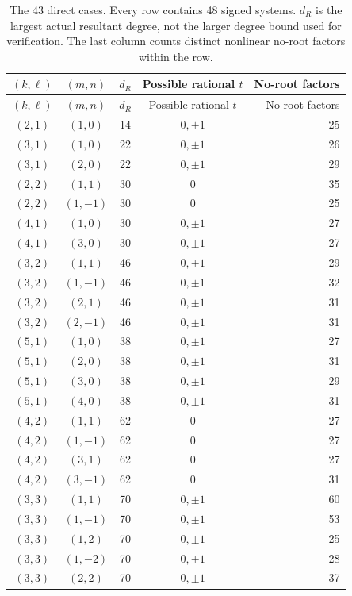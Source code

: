 {\small\setlength{\tabcolsep}{6pt}\renewcommand{\arraystretch}{1.12}
\begin{longtable}{ccccr}
\caption{The 43 direct cases. Every row contains 48 signed systems. $d_R$ is the largest actual resultant degree, not the larger degree bound used for verification. The last column counts distinct nonlinear no-root factors within the row.}\label{tab:representatives}\\
\toprule
$(k,\ell)$ & $(m,n)$ & $d_R$ & Possible rational $t$ & No-root factors\\
\midrule\endfirsthead
\toprule
$(k,\ell)$ & $(m,n)$ & $d_R$ & Possible rational $t$ & No-root factors\\
\midrule\endhead
$(2,1)$ & $(1,0)$ & 14 & $0,\pm1$ & 25\\
$(3,1)$ & $(1,0)$ & 22 & $0,\pm1$ & 26\\
$(3,1)$ & $(2,0)$ & 22 & $0,\pm1$ & 29\\
$(2,2)$ & $(1,1)$ & 30 & $0$ & 35\\
$(2,2)$ & $(1,-1)$ & 30 & $0$ & 25\\
$(4,1)$ & $(1,0)$ & 30 & $0,\pm1$ & 27\\
$(4,1)$ & $(3,0)$ & 30 & $0,\pm1$ & 27\\
$(3,2)$ & $(1,1)$ & 46 & $0,\pm1$ & 29\\
$(3,2)$ & $(1,-1)$ & 46 & $0,\pm1$ & 32\\
$(3,2)$ & $(2,1)$ & 46 & $0,\pm1$ & 31\\
$(3,2)$ & $(2,-1)$ & 46 & $0,\pm1$ & 31\\
$(5,1)$ & $(1,0)$ & 38 & $0,\pm1$ & 27\\
$(5,1)$ & $(2,0)$ & 38 & $0,\pm1$ & 31\\
$(5,1)$ & $(3,0)$ & 38 & $0,\pm1$ & 29\\
$(5,1)$ & $(4,0)$ & 38 & $0,\pm1$ & 31\\
$(4,2)$ & $(1,1)$ & 62 & $0$ & 27\\
$(4,2)$ & $(1,-1)$ & 62 & $0$ & 27\\
$(4,2)$ & $(3,1)$ & 62 & $0$ & 27\\
$(4,2)$ & $(3,-1)$ & 62 & $0$ & 31\\
$(3,3)$ & $(1,1)$ & 70 & $0,\pm1$ & 60\\
$(3,3)$ & $(1,-1)$ & 70 & $0,\pm1$ & 53\\
$(3,3)$ & $(1,2)$ & 70 & $0,\pm1$ & 25\\
$(3,3)$ & $(1,-2)$ & 70 & $0,\pm1$ & 28\\
$(3,3)$ & $(2,2)$ & 70 & $0,\pm1$ & 37\\

\end{longtable}}
